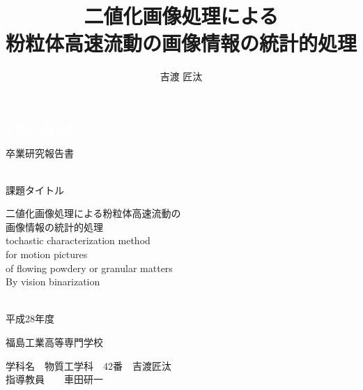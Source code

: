 \documentclass[a4j,12pt,dvipdfmx]{jsarticle}
\title{二値化画像処理による \\ 粉粒体高速流動の画像情報の統計的処理}
\author{吉渡 匠汰}
\date{ } %
\newcommand*\circled[1]{\tikz[baseline=(char.base)]{
  \node[shape=circle,draw,inner sep=2pt] (char) {#1};}}
\begin{document}

\begin{center}
\fontsize{22pt}{30pt}\selectfont
\textcolor{white}{卒業研究報告書}

卒\quad 業\quad 研\quad 究\quad 報\quad 告\quad 書
\\[7pt]
\fontsize{20pt}{30pt}\selectfont
\hrulefill \\
\begin{flushleft}
課題タイトル

二値化画像処理による粉粒体高速流動の\\ 画像情報の統計的処理
\\[14pt]
tochastic characterization method \\
for motion pictures \\
of flowing powdery or granular matters \\
By vision binarization 
\\[7pt]
\end{flushleft}
\hrulefill
\\[15pt]
平成28年度

\fontsize{18pt}{20pt}\selectfont
\begin{flushleft}
福島工業高等専門学校
\end{flushleft}

学科名　物質工学科　42番　吉渡匠汰
%
%
\\[36pt]
指導教員　　車田研一　　\circled{{\large 印}}
\end{center}

\clearpage
\end{document}
